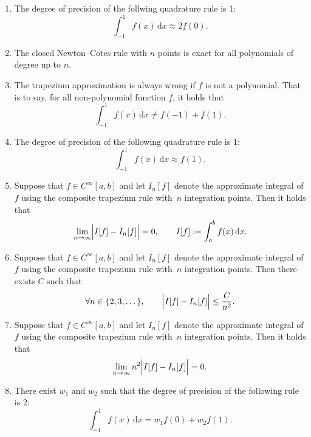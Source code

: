 \documentclass[a4paper]{article}
\renewcommand{\d}{\mathrm d}
\begin{document}
\begin{enumerate}

    \item
        The degree of precision of the follwing quadrature rule is 1:
        \[
            \int_{-1}^{1} f(x) \, \d x
            \approx 2 f(0).
        \]

    \item
        The closed Newton--Cotes rule with $n$ points is exact for all polynomials of degree up to $n$.

    \item
        The trapezium approximation is always wrong if $f$ is not a polynomial.
        That is to say, for all non-polynomial function $f$, it holds that
        \[
            \int_{-1}^1 f(x) \, \d x \neq f(-1) + f(1).
        \]

    \item
        The degree of precision of the following quadrature rule is 1:
        \[
            \int_{-1}^1 f(x) \, \d x \approx f(1).
        \]

    \item
        Suppose that $f \in C^{\infty}[a, b]$ and let $I_n[f]$ denote the approximate integral of $f$ using the composite trapezium rule
        with~$n$ integration points.
        Then it holds that
        \[
            \lim_{n \to \infty} \Bigl\lvert I[f] - I_n[f] \Bigr\rvert = 0, \qquad I[f] := \int_{a}^{b} f(x) \, \d x.
        \]

    \item
        Suppose that $f \in C^{\infty}[a, b]$ and let $I_n[f]$ denote the approximate integral of $f$ using the composite trapezium rule
        with~$n$ integration points.
        Then there exists $C$ such that
        \[
             \forall n \in \{2, 3, \dotsc \}, \qquad
             \Bigl\lvert I[f] - I_n[f] \Bigr\rvert \leq \frac{C}{n^2}.
        \]

    \item
        Suppose that $f \in C^{\infty}[a, b]$ and let $I_n[f]$ denote the approximate integral of $f$ using the composite trapezium rule
        with~$n$ integration points.
        Then it holds that
        \[
             \lim_{n \to \infty} n^2 \Bigl\lvert I[f] - I_n[f] \Bigr\rvert = 0.
        \]

    \item
        There exist $w_1$ and $w_2$ such that the degree of precision of the following rule is $2$:
        \[
            \int_{-1}^1 f(x) \, \d x = w_1 f(0) + w_2 f(1).
        \]


\end{enumerate}
\end{document}
